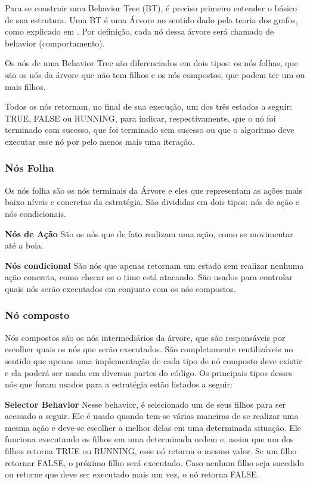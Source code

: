 \documentclass[conference]{IEEEtran}
\begin{document}
Para se construir uma Behavior Tree (BT), é preciso primeiro entender o básico de sua estrutura. Uma BT é uma Árvore no sentido dado pela teoria dos grafos, como explicado em \cite{west2001introduction}. Por definição, cada nó dessa árvore será chamado de behavior (comportamento).

Os nós de uma Behavior Tree são diferenciados em dois tipos: os nós folhas, que são os nós da árvore que não tem filhos e os nós compostos, que podem ter um ou mais filhos.

Todos os nós retornam, no final de sua execução, um dos três estados a seguir: TRUE, FALSE ou RUNNING, para indicar, respectivamente, que o nó foi terminado com sucesso, que foi terminado sem sucesso ou que o algoritmo deve executar esse nó por pelo menos mais uma iteração.

\subsubsection{Nós Folha}

Os nós folha são os nós terminais da Árvore e eles que representam as ações mais baixo níveis e concretas da estratégia. São divididas em dois tipos: nós de ação e nós condicionais.

\textbf{Nós de Ação} São os nós que de fato realizam uma ação, como se movimentar até a bola.

\textbf{Nós condicional} São nós que apenas retornam um estado sem realizar nenhuma ação concreta, como checar se o time está atacando. São usados para controlar quais nós serão executados em conjunto com os nós compostos.

\subsubsection{Nó composto}

Nós compostos são os nós intermediários da árvore, que  são responsáveis por escolher quais os nós que serão executados. São completamente reutilizáveis no sentido que apenas uma implementação de cada tipo de nó composto deve existir e ela poderá ser usada em diversas partes do código. Os principais tipos desses nós que foram usados para a estratégia estão listados a seguir:

\textbf{Selector Behavior} Nesse behavior, é selecionado um de seus filhos para ser acessado a seguir. Ele é usado quando tem-se várias maneiras de se realizar uma mesma ação e deve-se escolher a melhor delas em uma determinada situação. Ele funciona executando os filhos em uma determinada ordem e, assim que um dos filhos retorna TRUE ou RUNNING, esse nó retorna o mesmo valor. Se um filho retornar FALSE, o próximo filho será executado. Caso nenhum filho seja sucedido ou retorne que deve ser executado mais um vez, o nó retorna FALSE.
\end{document}

